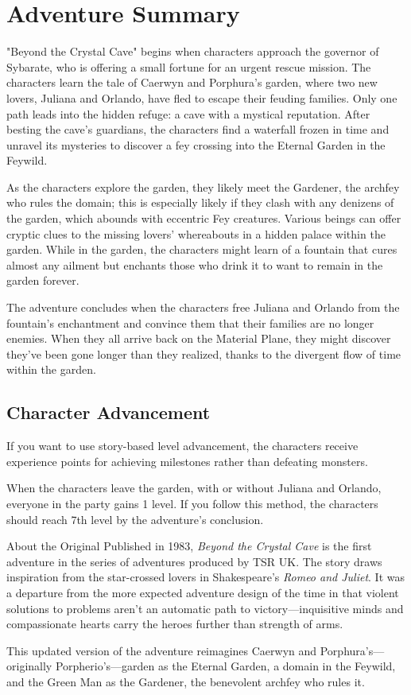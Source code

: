 \documentclass[10pt,a4paper,twoside,bg=print,twocolumn,openany,nodeprecatedcode]{dndbook}
\begin{document}
\section{Adventure Summary}
"Beyond the Crystal Cave" begins when characters approach the governor of Sybarate, who is offering a small fortune for an urgent rescue mission. The characters learn the tale of Caerwyn and Porphura's garden, where two new lovers, Juliana and Orlando, have fled to escape their feuding families. Only one path leads into the hidden refuge: a cave with a mystical reputation. After besting the cave's guardians, the characters find a waterfall frozen in time and unravel its mysteries to discover a fey crossing into the Eternal Garden in the Feywild.

As the characters explore the garden, they likely meet the Gardener, the archfey who rules the domain; this is especially likely if they clash with any denizens of the garden, which abounds with eccentric Fey creatures. Various beings can offer cryptic clues to the missing lovers' whereabouts in a hidden palace within the garden. While in the garden, the characters might learn of a fountain that cures almost any ailment but enchants those who drink it to want to remain in the garden forever.

The adventure concludes when the characters free Juliana and Orlando from the fountain's enchantment and convince them that their families are no longer enemies. When they all arrive back on the Material Plane, they might discover they've been gone longer than they realized, thanks to the divergent flow of time within the garden.

\subsection{Character Advancement}
If you want to use story-based level advancement, the characters receive experience points for achieving milestones rather than defeating monsters.

When the characters leave the garden, with or without Juliana and Orlando, everyone in the party gains 1 level. If you follow this method, the characters should reach 7th level by the adventure's conclusion.

\begin{DndReadAloud}{About the Original}
Published in 1983, \textit{Beyond the Crystal Cave} is the first adventure in the series of adventures produced by TSR UK. The story draws inspiration from the star-crossed lovers in Shakespeare's \textit{Romeo and Juliet}. It was a departure from the more expected adventure design of the time in that violent solutions to problems aren't an automatic path to victory—inquisitive minds and compassionate hearts carry the heroes further than strength of arms.

This updated version of the adventure reimagines Caerwyn and Porphura's—originally Porpherio's—garden as the Eternal Garden, a domain in the Feywild, and the Green Man as the Gardener, the benevolent archfey who rules it.

\end{DndReadAloud}
\end{document}
